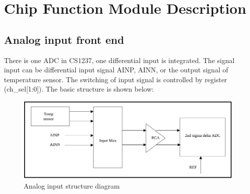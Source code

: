 \documentclass{article}
\begin{document}
\begin{table}[h]
    \caption{Note: REFOUT is the sensor excitation source output (output value is VDD).}
    \label{tab:table6}
\end{table}

\pagebreak

\section{Chip Function Module Description}

\subsection{Analog input front end}

There is one ADC in CS1237, one differential input is integrated. The signal input can be differential
input signal AINP, AINN, or the output signal of temperature sensor. The switching of input signal is
controlled by register (ch\_sel[1:0]). The basic structure is shown below:

\begin{figure}[h]
    \centering
    \includegraphics[width=1\textwidth]{fig3.png}
    \caption{Analog input structure diagram}
    \label{fig:fig4}
\end{figure}
\end{document}
